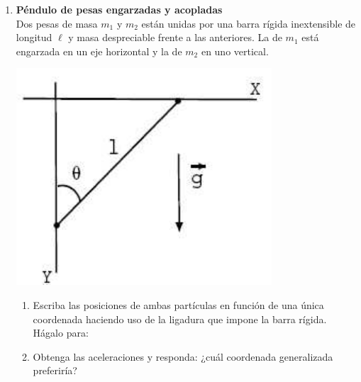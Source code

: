 \documentclass[11pt, spanish, a4paper, twoside]{article}
\begin{document}
\begin{enumerate}
\item 
\begin{minipage}[t][1.5cm]{0.7\textwidth}
	\textbf{Péndulo de pesas engarzadas y acopladas}\\ 
	Dos pesas de masa \(m_1\) y \(m_2\) están unidas por una barra rígida inextensible de longitud \(\ell\) y masa despreciable frente a las anteriores.
	La de \(m_1\) está engarzada en un eje horizontal y la de \(m_2\) en uno vertical.
\end{minipage}
\begin{minipage}[c][2cm][t]{0.3\textwidth}
	\includegraphics[width=0.75\textwidth]{figures/fcen1-004}
\end{minipage}
\begin{enumerate}
	\item Escriba las posiciones de ambas partículas en función de una única coordenada haciendo uso de la ligadura que impone la barra rígida.
	Hágalo para:
	\item Obtenga las aceleraciones y responda: ¿cuál coordenada generalizada preferiría?\\

\end{enumerate}
\end{enumerate}
\end{document}

